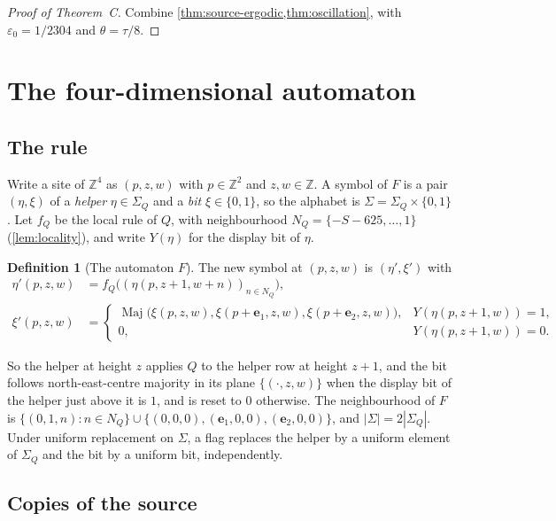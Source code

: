 \documentclass[11pt]{article}
\theoremstyle{plain}
\theoremstyle{definition}
\newtheorem{definition}[theorem]{Definition}
\theoremstyle{remark}
\newcommand{\Z}{\mathbb Z}
\newcommand{\eps}{\varepsilon}
\newcommand{\Maj}{\operatorname{Maj}}
\newcommand{\SigQ}{\Sigma_Q}
\begin{document}
\begin{proof}[Proof of Theorem~C]
Combine \cref{thm:source-ergodic,thm:oscillation}, with $\eps_0=1/2304$ and $\theta=\tau/8$.
\end{proof}

\section{The four-dimensional automaton}\label{sec:four}

\subsection{The rule}

Write a site of $\Z^4$ as $(p,z,w)$ with $p\in\Z^2$ and $z,w\in\Z$. A symbol of $F$ is a pair $(\eta,\xi)$ of a \emph{helper} $\eta\in\SigQ$ and a \emph{bit} $\xi\in\{0,1\}$, so the alphabet is $\Sigma=\SigQ\times\{0,1\}$. Let $f_Q$ be the local rule of $Q$, with neighbourhood $N_Q=\{-S-625,\dots,1\}$ (\cref{lem:locality}), and write $Y(\eta)$ for the display bit of $\eta$.

\begin{definition}[The automaton $F$]\label{def:F}
The new symbol at $(p,z,w)$ is $(\eta',\xi')$ with
\begin{align*}
\eta'(p,z,w)&=f_Q\bigl((\eta(p,z+1,w+n))_{n\in N_Q}\bigr),\\
\xi'(p,z,w)&=\begin{cases}\Maj\bigl(\xi(p,z,w),\xi(p+\mathbf e_1,z,w),\xi(p+\mathbf e_2,z,w)\bigr),&Y(\eta(p,z+1,w))=1,\\ 0,&Y(\eta(p,z+1,w))=0.\end{cases}
\end{align*}
\end{definition}

So the helper at height $z$ applies $Q$ to the helper row at height $z+1$, and the bit follows north-east-centre majority in its plane $\{(\cdot,z,w)\}$ when the display bit of the helper just above it is $1$, and is reset to $0$ otherwise. The neighbourhood of $F$ is $\{(0,1,n):n\in N_Q\}\cup\{(0,0,0),(\mathbf e_1,0,0),(\mathbf e_2,0,0)\}$, and $|\Sigma|=2|\SigQ|$. Under uniform replacement on $\Sigma$, a flag replaces the helper by a uniform element of $\SigQ$ and the bit by a uniform bit, independently.

\subsection{Copies of the source}
\end{document}
